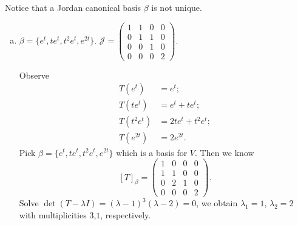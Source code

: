 \begin{Exercise}
	Notice that a Jordan canonical basis $\beta$ is not unique.
	\begin{enumerate}[(a)]
		\item
		\begin{answer}
			$\beta = \{e^t, t e^t, t^2 e^t, e^{2t}\}$. $\mathcal{J} = \begin{pmatrix}
			1 & 1 & 0 & 0 \\
			0 & 1 & 1 & 0 \\
			0 & 0 & 1 & 0 \\
			0 & 0 & 0 & 2
			\end{pmatrix}$. 
		\end{answer}
		\begin{solution}
			Observe
			\begin{align*}
			T(e^t) &= e^t; \\
			T(t e^t) &= e^t + t e^t; \\
			T(t^2 e^t) &= 2t e^t + t^2 e^t; \\
			T(e^{2t}) &= 2e^{2t}.
			\end{align*}
			Pick $\beta = \{e^t, t e^t, t^2 e^t, e^{2t}\}$ which is a basis for $V$. Then we know
			$$
			[T]_{\beta} = \begin{pmatrix}
			1 & 0 & 0 & 0 \\
			1 & 1 & 0 & 0 \\
			0 & 2 & 1 & 0 \\
			0 & 0 & 0 & 2
			\end{pmatrix}.
			$$
			Solve $\det(T-\lambda I) = (\lambda-1)^3 (\lambda-2) = 0$, we obtain $\lambda_1 = 1$, $\lambda_2 = 2$ with multiplicities $3$,$1$, respectively.
			

\end{solution}
\end{enumerate}
\end{Exercise}
